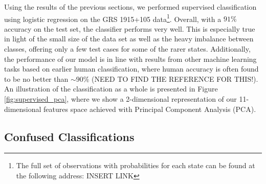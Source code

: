 \documentclass[12pt]{emulateapj}
\begin{document}
Using the results of the previous sections, we performed supervised classification using logistic regression on the GRS 1915+105 data\footnote{The full set of observations with probabilities for each state can be found at the following address: INSERT LINK}.
Overall, with a $91\%$ accuracy on the test set, the classifier performs very well. This is especially true in light of the small size of the data set as well
as the heavy imbalance between classes, offering only a few test cases for some of the rarer states. Additionally, the performance of our model is in 
line with results from other machine learning tasks based on earlier human classification, where human accuracy is often found to be no better than 
$\sim 90\%$ (NEED TO FIND THE REFERENCE FOR THIS!). An illustration of the classification as a whole is presented in Figure \ref{fig:supervised_pca}, 
where we show a 2-dimensional representation of our 11-dimensional features space achieved with Principal Component Analysis (PCA). 

\subsection{Confused Classifications}
\label{sec:confusion}
\end{document}
